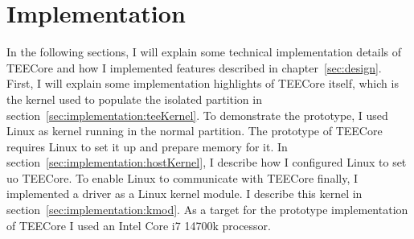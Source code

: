 \chapter{Implementation}
\label{sec:implementation}


In the following sections, I will explain some technical implementation details
of TEECore and how I implemented features described in chapter~\ref{sec:design}.
First, I will explain some implementation highlights of TEECore itself, which is
the kernel used to populate the isolated partition in
section~\ref{sec:implementation:teeKernel}. To demonstrate the prototype, I used
Linux as kernel running in the normal partition. The prototype of TEECore
requires Linux to set it up and prepare memory for it. In
section~\ref{sec:implementation:hostKernel}, I describe how I configured Linux
to set uo TEECore. To enable Linux to communicate with TEECore finally, I
implemented a driver as a Linux kernel module. I describe this kernel in
section~\ref{sec:implementation:kmod}. As a target for the prototype implementation of TEECore I used an
Intel Core i7 14700k processor.

